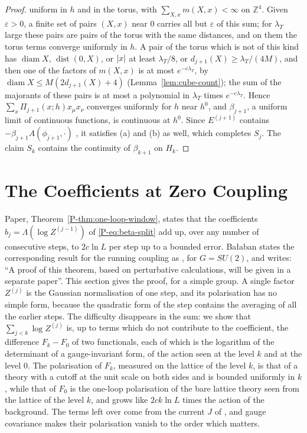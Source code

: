 \documentclass[11pt]{preprint}
\newcommand{\diam}{\operatorname{diam}}
\newcommand{\dist}{\operatorname{dist}}
\DeclarePairedDelimiter{\abs}{\lvert}{\rvert}
\numberwithin{equation}{section}
\theoremstyle{definition}
\theoremstyle{remark}
\theoremstyle{plain}
\begin{document}
\begin{proof}
uniform in $h$ and in the torus, with $\sum_{X,x}m(X, x) < \infty$ on $\mathbb Z^4$. Given $\varepsilon > 0$, a finite set of pairs $(X, x)$ near $0$ carries all but $\varepsilon$ of this sum; for $\lambda_T$ large these pairs are pairs of the torus with the same distances, and on them the torus terms converge uniformly in $h$. A pair of the torus which is not of this kind has $\diam X$, $\dist(0, X)$, or $\abs{x}$ at least $\lambda_T/8$, or $d_{j+1}(X) \geq \lambda_T/(4M)$, and then one of the factors of $m(X, x)$ is at most $e^{-c\lambda_T}$, by $\diam X \leq M(2d_{j+1}(X) + 4)$ (Lemma~\ref{lem:cube-count}); the sum of the majorants of these pairs is at most a polynomial in $\lambda_T$ times $e^{-c\lambda_T}$. Hence $\sum_x\Pi_{j+1}(x; h)x_\mu x_\nu$ converges uniformly for $h$ near $h^0$, and $\beta_{j+1}$, a uniform limit of continuous functions, is continuous at $h^0$. Since $E^{(j+1)}$ contains $-\beta_{j+1}A(\phi_{j+1}, \cdot)$ \cite[(2.25), p.~259]{BalabanCRE}, it satisfies (a) and (b) as well, which completes $S_j$. The claim $S_k$ contains the continuity of $\beta_{k+1}$ on $H_k$.
\end{proof}

\section{The Coefficients at Zero Coupling}\label{sec:zero-coupling}

Paper, Theorem~\ref{P-thm:one-loop-window}, states that the coefficients $b_j = \Lambda(\log Z^{(j-1)})$ of \eqref{P-eq:beta-split} add up, over any number of consecutive steps, to $2c\ln L$ per step up to a bounded error. Ba{\l}aban states the corresponding result for the running coupling as \cite[Theorem~2, p.~259]{BalabanRG1}, for $G = SU(2)$, and writes: ``A proof of this theorem, based on perturbative calculations, will be given in a separate paper''. This section gives the proof, for a simple group. A single factor $Z^{(j)}$ is the Gaussian normalisation of one step, and its polarisation has no simple form, because the quadratic form of the step contains the averaging of all the earlier steps. The difficulty disappears in the sum: we show that $\sum_{j<k}\log Z^{(j)}$ is, up to terms which do not contribute to the coefficient, the difference $F_k - F_0$ of two functionals, each of which is the logarithm of the determinant of a gauge-invariant form, of the action seen at the level $k$ and at the level $0$. The polarisation of $F_k$, measured on the lattice of the level $k$, is that of a theory with a cutoff at the unit scale on both sides and is bounded uniformly in $k$, while that of $F_0$ is the one-loop polarisation of the bare lattice theory seen from the lattice of the level $k$, and grows like $2ck\ln L$ times the action of the background. The terms left over come from the current $J$ of \cite[(1.8), p.~261]{BalabanRG1}, and gauge covariance makes their polarisation vanish to the order which matters.
\end{document}

